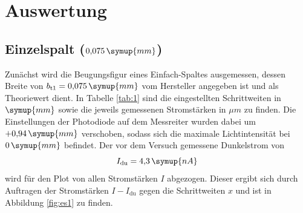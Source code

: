 \section{Auswertung}
\subsection{Einzelspalt ($0{,}075\,\symup{mm}$)}

Zunächst wird die Beugungsfigur eines Einfach-Spaltes ausgemessen, dessen Breite von $b_{\text{t1}} = 0{,}075\,\symup{mm}$ vom Hersteller angegeben ist und als Theoriewert dient.
In Tabelle \ref{tab:1} sind die eingestellten Schrittweiten in $\symup{mm}$ sowie die jeweils gemessenen Stromstärken in $\mu m$ zu finden. Die Einstellungen der Photodiode auf dem Messreiter
wurden dabei um $+0{,}94\,\symup{mm}$ verschoben, sodass sich die maximale Lichtintensität bei $0\,\symup{mm}$ befindet. Der vor dem Versuch gemessene Dunkelstrom von 
\begin{equation*}
I_{\text{du}} = 4{,}3\,\symup{nA}
\end{equation*} 
wird für den Plot von allen Stromstärken $I$ abgezogen. Dieser ergibt sich durch Auftragen der Stromstärken $I-I_{\text{du}}$ gegen die Schrittweiten $x$ und ist in Abbildung \ref{fig:es1} zu finden. 

